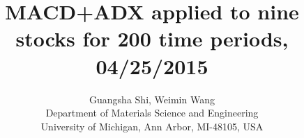 \documentclass{article} %
\title{MACD+ADX applied to nine stocks for 200 time periods, 04/25/2015}
\author{
Guangsha Shi, Weimin Wang\\
Department of Materials Science and Engineering\\
University of Michigan, Ann Arbor, MI-48105, USA\\
}
\begin{document}
\maketitle




\small
%
\normalsize
\end{document}
